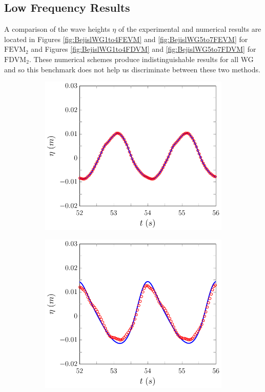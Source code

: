 \subsection{Low Frequency Results}
A comparison of the wave heights $\eta$ of the experimental and numerical results are located in Figures \ref{fig:BejislWG1to4FEVM} and \ref{fig:BejislWG5to7FEVM} for $\text{FEVM}_2$ and Figures \ref{fig:BejislWG1to4FDVM} and \ref{fig:BejislWG5to7FDVM} for $\text{FDVM}_2$. These numerical schemes produce indistinguishable results for all WG and so this benchmark does not help us discriminate between these two methods. 
\begin{figure}
	\centering
	\begin{subfigure}{0.5\textwidth}
		\includegraphics[width=\textwidth]{./chp6/figures/Experiment/Beji/sl/FEVMWG1.pdf}
		\vspace{0.5cm}
	\end{subfigure}%
	\begin{subfigure}{0.5\textwidth}
		\includegraphics[width=\textwidth]{./chp6/figures/Experiment/Beji/sl/FEVMWG2.pdf}

\end{subfigure}
\end{figure}
